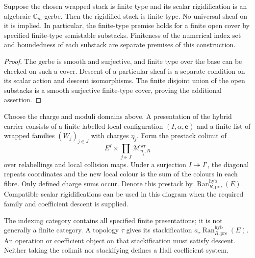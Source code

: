 \begin{proposition}
\label{prop:wrapped-prequotient-finite-type}
Suppose the chosen wrapped stack is finite type and its scalar
rigidification is an algebraic $\mathbb G_m$-gerbe. Then the
rigidified stack is finite type. No universal sheaf on it is implied.
In particular, the finite-type premise holds for a finite open
cover by specified finite-type semistable substacks. Finiteness of the
numerical index set and boundedness of each substack are separate
premises of this construction.
\end{proposition}

\begin{proof}
The gerbe is smooth and surjective, and finite type over the base
can be checked on such a cover. Descent of a particular sheaf is a
separate condition on its scalar action and descent isomorphisms.
The finite disjoint union of the open substacks is a smooth
surjective finite-type cover, proving the additional assertion.
\end{proof}

\begin{definition}
\label{def:hybrid-ran-prestack}
\label{def:hybrid-ran-base}
Choose the charge and moduli domains above. A presentation of the
hybrid carrier consists of a finite labelled local configuration
$(I,\alpha,\mathbf e)$ and a finite list of wrapped families
$(W_j)_{j\in J}$ with charges $\eta_j$. Form the prestack colimit
of
\[
 E^I\times\prod_{j\in J}\mathcal M^{\mathrm{wr}}_{\eta_j,R}
\]
over relabellings and local collision maps. Under a surjection
$I\twoheadrightarrow I'$, the diagonal repeats coordinates and
the new local colour is the sum of the colours in each fibre.
Only defined charge sums occur. Denote this prestack by
$\operatorname{Ran}^{\mathrm{hyb}}_{R,\mathrm{pre}}(E)$.
Compatible scalar rigidifications can be used in this diagram when
the required family and coefficient descent is supplied.
\end{definition}

The indexing category contains all specified finite presentations;
it is not generally a finite category. A topology $\tau$ gives its
stackification $a_\tau\operatorname{Ran}^{\mathrm{hyb}}_{R,\mathrm{pre}}(E)$.
An operation or coefficient object on that stackification must
satisfy descent. Neither taking the colimit nor stackifying defines
a Hall coefficient system.

